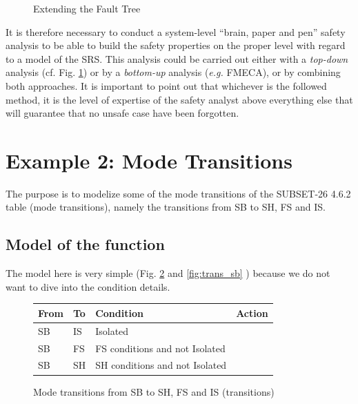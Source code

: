 \documentclass{template/openetcs_article}
\begin{document}
\begin{figure}
  \centering
  \caption{Extending the Fault Tree}
  \label{fig:ext_fta}
\end{figure}

It is therefore necessary to conduct a system-level ``brain, paper and pen'' safety analysis to 
be able to build the safety properties on the proper level with regard to a model of the SRS. This
analysis could be carried out either with a \emph{top-down} analysis (cf. Fig. \ref{fig:ext_fta}) or 
by a \emph{bottom-up} analysis (\emph{e.g.} FMECA), or by combining both approaches. It is important
to point out that whichever is the followed method, it is the level of expertise of the safety analyst
above everything else that will guarantee that no unsafe case have been forgotten.

\section{Example 2: Mode Transitions}
The purpose is to modelize some of the mode transitions of the SUBSET-26 4.6.2 table (mode transitions), 
namely the transitions from SB to SH, FS and IS.

\subsection{Model of the function}
The model here is very simple (Fig. \ref{fig:trans_sb_tab} and \ref{fig:trans_sb} ) 
because we do not want to dive into the condition details.

\begin{figure}
\centering
\small
\begin{tabular}{|l|l||p{3.5cm}|p{3.5cm}|}
\hline
\bf From & \bf To & \bf Condition & \bf Action \\
\hline
SB & IS & Isolated &  \\
\hline
SB & FS & FS conditions and not Isolated &  \\
\hline
SB & SH & SH conditions and not Isolated &  \\
\hline
\end{tabular}
\normalsize
\caption{Mode transitions from SB to SH, FS and IS (transitions)}
\label{fig:trans_sb_tab}
\end{figure}
\end{document}
